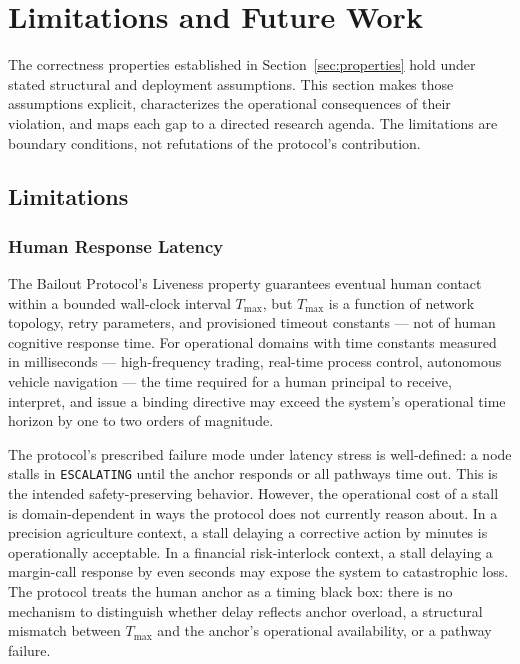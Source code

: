 \section{Limitations and Future Work}
\label{sec:limitations}

The correctness properties established in Section~\ref{sec:properties} hold under stated structural and deployment assumptions. This section makes those assumptions explicit, characterizes the operational consequences of their violation, and maps each gap to a directed research agenda. The limitations are boundary conditions, not refutations of the protocol's contribution.

\subsection{Limitations}
\label{sec:limitations:subsection}

\subsubsection{Human Response Latency}
\label{sec:human-response-latency}

The Bailout Protocol's Liveness property guarantees eventual human contact within a bounded wall-clock interval $T_{\max}$, but $T_{\max}$ is a function of network topology, retry parameters, and provisioned timeout constants --- not of human cognitive response time. For operational domains with time constants measured in milliseconds --- high-frequency trading, real-time process control, autonomous vehicle navigation --- the time required for a human principal to receive, interpret, and issue a binding directive may exceed the system's operational time horizon by one to two orders of magnitude.

The protocol's prescribed failure mode under latency stress is well-defined: a node stalls in \texttt{ESCALATING} until the anchor responds or all pathways time out. This is the intended safety-preserving behavior. However, the operational cost of a stall is domain-dependent in ways the protocol does not currently reason about. In a precision agriculture context, a stall delaying a corrective action by minutes is operationally acceptable. In a financial risk-interlock context, a stall delaying a margin-call response by even seconds may expose the system to catastrophic loss. The protocol treats the human anchor as a timing black box: there is no mechanism to distinguish whether delay reflects anchor overload, a structural mismatch between $T_{\max}$ and the anchor's operational availability, or a pathway failure.

